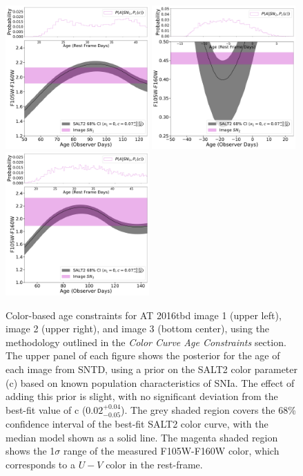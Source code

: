 \documentclass[12pt]{article}
\def\SNABC{AT 2016tbd\xspace}
\begin{document}
\begin{figure}
    \centering
    \includegraphics[width=0.49\textwidth]{Paper/Figures/colorcurve_image1.pdf}
    \includegraphics[width=0.49\textwidth]{Paper/Figures/colorcurve_image2.pdf}
    \includegraphics[width=0.49\textwidth]{Paper/Figures/colorcurve_image3.pdf}
    \caption{Color-based age constraints for \SNABC image 1 (upper left), image 2 (upper right), and image 3 (bottom center), using the methodology outlined in the \textit{Color Curve Age Constraints} section. The upper panel of each figure shows the posterior for the age of each image from SNTD, using a prior on the SALT2 color parameter (c) based on known population characteristics of SNIa. The effect of adding this prior is slight, with no significant deviation from the best-fit value of c ($0.02^{+0.04}_{-0.05}$). The grey shaded region covers the 68\% confidence interval of the best-fit SALT2 color curve, with the median model shown as a solid line. The magenta shaded region shows the 1$\sigma$ range of the measured F105W-F160W color, which corresponds to a $U-V$ color in the rest-frame.}
    \label{fig:colorcurves}
\end{figure}
\end{document}
